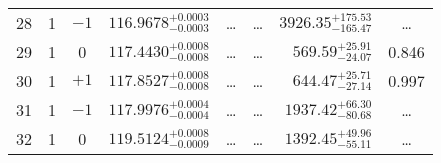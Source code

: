 \begin{table*}[!]
\begin{tabular}{llcrrlrc}
28 & 1 & $-1$ & $    116.9678_{-      0.0003}^{+      0.0003}$ & \multicolumn{1}{c}{\dots} & \multicolumn{1}{c}{\dots} & $     3926.35_{-      165.47}^{+      175.53}$ & \dots \\[1pt]
29 & 1 & 0 & $    117.4430_{-      0.0008}^{+      0.0008}$ & \multicolumn{1}{c}{\dots} & \multicolumn{1}{c}{\dots} & $      569.59_{-       24.07}^{+       25.91}$ & 0.846\\[1pt]
30 & 1 & $+1$ & $    117.8527_{-      0.0008}^{+      0.0008}$ & \multicolumn{1}{c}{\dots} & \multicolumn{1}{c}{\dots} & $      644.47_{-       27.14}^{+       25.71}$ & 0.997\\[1pt]
31 & 1 & $-1$ & $    117.9976_{-      0.0004}^{+      0.0004}$ & \multicolumn{1}{c}{\dots} & \multicolumn{1}{c}{\dots} & $     1937.42_{-       80.68}^{+       66.30}$ & \dots \\[1pt]
32 & 1 & 0 & $    119.5124_{-      0.0009}^{+      0.0008}$ & \multicolumn{1}{c}{\dots} & \multicolumn{1}{c}{\dots} & $     1392.45_{-       55.11}^{+       49.96}$ & \dots \\[1pt]


\end{tabular}
\end{table*}
